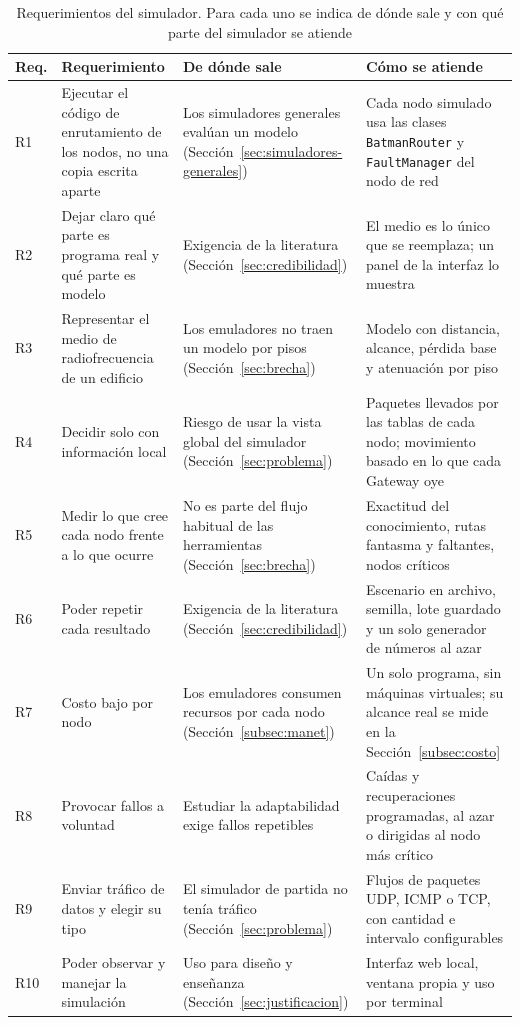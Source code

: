 \begin{table}[htbp!]
    \centering
    \caption{Requerimientos del simulador. Para cada uno se indica de dónde sale y con qué parte del simulador se atiende}
    \label{tab:requisitos}
    \footnotesize
    \begin{tabular}{|p{0.7cm}|p{4.9cm}|p{3.3cm}|p{4.9cm}|}
        \hline
        \textbf{Req.} & \textbf{Requerimiento} & \textbf{De dónde sale} & \textbf{Cómo se atiende} \\
        \hline
        R1 & Ejecutar el código de enrutamiento de los nodos, no una copia escrita aparte & Los simuladores generales evalúan un modelo (Sección~\ref{sec:simuladores-generales}) & Cada nodo simulado usa las clases \texttt{BatmanRouter} y \texttt{FaultManager} del nodo de red \\
        \hline
        R2 & Dejar claro qué parte es programa real y qué parte es modelo & Exigencia de la literatura (Sección~\ref{sec:credibilidad}) & El medio es lo único que se reemplaza; un panel de la interfaz lo muestra \\
        \hline
        R3 & Representar el medio de radiofrecuencia de un edificio & Los emuladores no traen un modelo por pisos (Sección~\ref{sec:brecha}) & Modelo con distancia, alcance, pérdida base y atenuación por piso \\
        \hline
        R4 & Decidir solo con información local & Riesgo de usar la vista global del simulador (Sección~\ref{sec:problema}) & Paquetes llevados por las tablas de cada nodo; movimiento basado en lo que cada Gateway oye \\
        \hline
        R5 & Medir lo que cree cada nodo frente a lo que ocurre & No es parte del flujo habitual de las herramientas (Sección~\ref{sec:brecha}) & Exactitud del conocimiento, rutas fantasma y faltantes, nodos críticos \\
        \hline
        R6 & Poder repetir cada resultado & Exigencia de la literatura (Sección~\ref{sec:credibilidad}) & Escenario en archivo, semilla, lote guardado y un solo generador de números al azar \\
        \hline
        R7 & Costo bajo por nodo & Los emuladores consumen recursos por cada nodo (Sección~\ref{subsec:manet}) & Un solo programa, sin máquinas virtuales; su alcance real se mide en la Sección~\ref{subsec:costo} \\
        \hline
        R8 & Provocar fallos a voluntad & Estudiar la adaptabilidad exige fallos repetibles & Caídas y recuperaciones programadas, al azar o dirigidas al nodo más crítico \\
        \hline
        R9 & Enviar tráfico de datos y elegir su tipo & El simulador de partida no tenía tráfico (Sección~\ref{sec:problema}) & Flujos de paquetes UDP, ICMP o TCP, con cantidad e intervalo configurables \\
        \hline
        R10 & Poder observar y manejar la simulación & Uso para diseño y enseñanza (Sección~\ref{sec:justificacion}) & Interfaz web local, ventana propia y uso por terminal \\
        \hline
    \end{tabular}
\end{table}

